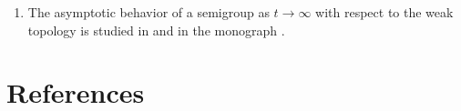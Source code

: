 \begin{enumerate}
\item
The asymptotic behavior of a semigroup as $t \rightarrow \infty$  with respect to the weak topology is studied in 
\textcite{zbmath05491771} and in the monograph \textcite{zbmath05625330}.

\end{enumerate}
\section*{References}
{\RaggedRight
  \printbibliography[heading=none]
 }
